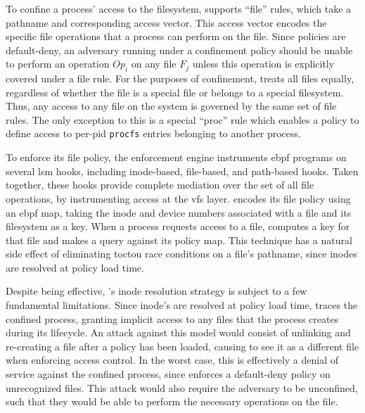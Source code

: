 \subsubsection{\bpfbox{}}

To confine a process' access to the filesystem, \bpfbox{} supports \enquote{file} rules,
which take a pathname and corresponding access vector. This access vector encodes the
specific file operations that a process can perform on the file. Since \bpfbox{} policies
are default-deny, an adversary running under a \bpfbox{} confinement policy should be
unable to perform an operation $Op_i$ on any file $F_j$ unless this operation is
explicitly covered under a file rule. For the purposes of confinement, \bpfbox{} treats
all files equally, regardless of whether the file is a special file or belongs to
a special filesystem. Thus, any access to any file on the system is governed by the same
set of file rules. The only exception to this is a special \enquote{proc} rule which
enables a policy to define access to per-pid \texttt{procfs} entries belonging to another
process.

To enforce its file policy, the \bpfbox{} enforcement engine instruments \gls{ebpf}
programs on several \gls{lsm} hooks, including inode-based, file-based, and path-based
hooks. Taken together, these hooks provide complete mediation over the set of all file
operations, by instrumenting access at the \gls{vfs} layer. \bpfbox{} encodes its file
policy using an \gls{ebpf} map, taking the inode and device numbers associated with a file
and its filesystem as a key. When a process requests access to a file, \bpfbox{} computes
a key for that file and makes a query against its policy map. This technique has a natural
side effect of eliminating \gls{toctou} race conditions on a file's pathname, since inodes
are resolved at policy load time.

Despite being effective, \bpfbox{}'s inode resolution strategy is subject to a few
fundamental limitations. Since inode's are resolved at policy load time, \bpfbox{} traces
the confined process, granting implicit access to any files that the process creates
during its lifecycle.  An attack against this model would consist of unlinking and
re-creating a file after a policy has been loaded, causing \bpfbox{} to see it as
a different file when enforcing access control. In the worst case, this is effectively
a denial of service against the confined process, since \bpfbox{} enforces a default-deny
policy on unrecognized files.  This attack would also require the adversary to be
unconfined, such that they would be able to perform the necessary operations on the file.

